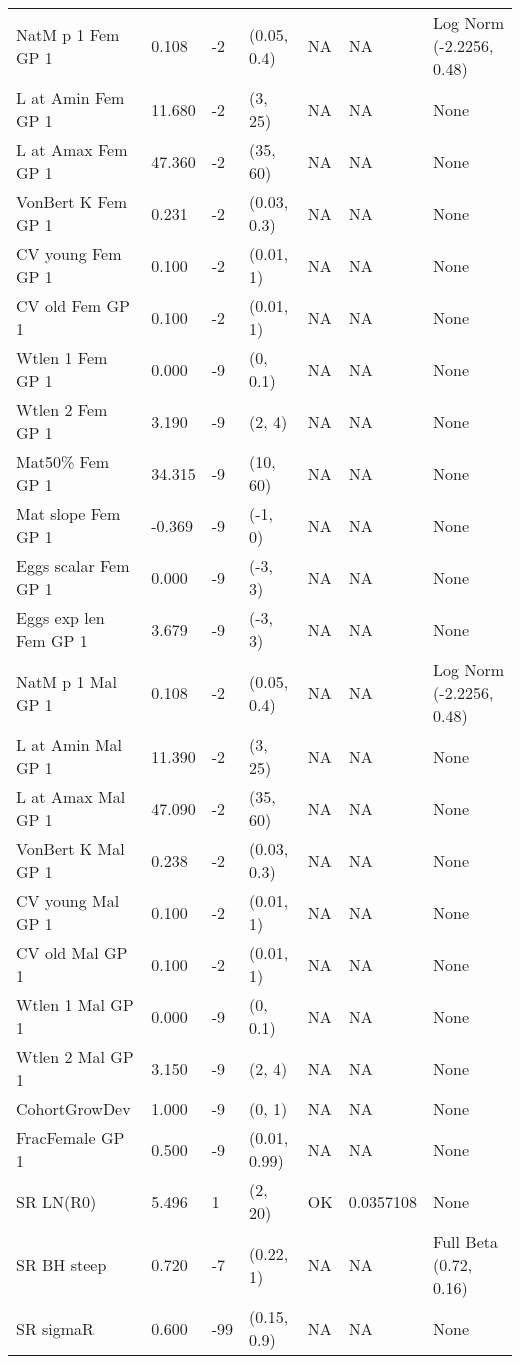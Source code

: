 \documentclass[11pt,
  english,
  a4paper,
]{article}
\begin{document}
\begin{landscape}
\begin{longtable}[t]{>{\raggedright\arraybackslash}p{6cm}lllll>{\raggedright\arraybackslash}p{4cm}}
\endfoot
\bottomrule
\endlastfoot
NatM p 1 Fem GP 1 & 0.108 & -2 & (0.05, 0.4) & NA & NA & Log Norm (-2.2256, 0.48)\\
L at Amin Fem GP 1 & 11.680 & -2 & (3, 25) & NA & NA & None\\
L at Amax Fem GP 1 & 47.360 & -2 & (35, 60) & NA & NA & None\\
VonBert K Fem GP 1 & 0.231 & -2 & (0.03, 0.3) & NA & NA & None\\
CV young Fem GP 1 & 0.100 & -2 & (0.01, 1) & NA & NA & None\\
CV old Fem GP 1 & 0.100 & -2 & (0.01, 1) & NA & NA & None\\
Wtlen 1 Fem GP 1 & 0.000 & -9 & (0, 0.1) & NA & NA & None\\
Wtlen 2 Fem GP 1 & 3.190 & -9 & (2, 4) & NA & NA & None\\
Mat50\% Fem GP 1 & 34.315 & -9 & (10, 60) & NA & NA & None\\
Mat slope Fem GP 1 & -0.369 & -9 & (-1, 0) & NA & NA & None\\
Eggs scalar Fem GP 1 & 0.000 & -9 & (-3, 3) & NA & NA & None\\
Eggs exp len Fem GP 1 & 3.679 & -9 & (-3, 3) & NA & NA & None\\
NatM p 1 Mal GP 1 & 0.108 & -2 & (0.05, 0.4) & NA & NA & Log Norm (-2.2256, 0.48)\\
L at Amin Mal GP 1 & 11.390 & -2 & (3, 25) & NA & NA & None\\
L at Amax Mal GP 1 & 47.090 & -2 & (35, 60) & NA & NA & None\\
VonBert K Mal GP 1 & 0.238 & -2 & (0.03, 0.3) & NA & NA & None\\
CV young Mal GP 1 & 0.100 & -2 & (0.01, 1) & NA & NA & None\\
CV old Mal GP 1 & 0.100 & -2 & (0.01, 1) & NA & NA & None\\
Wtlen 1 Mal GP 1 & 0.000 & -9 & (0, 0.1) & NA & NA & None\\
Wtlen 2 Mal GP 1 & 3.150 & -9 & (2, 4) & NA & NA & None\\
CohortGrowDev & 1.000 & -9 & (0, 1) & NA & NA & None\\
FracFemale GP 1 & 0.500 & -9 & (0.01, 0.99) & NA & NA & None\\
SR LN(R0) & 5.496 & 1 & (2, 20) & OK & 0.0357108 & None\\
SR BH steep & 0.720 & -7 & (0.22, 1) & NA & NA & Full Beta (0.72, 0.16)\\
SR sigmaR & 0.600 & -99 & (0.15, 0.9) & NA & NA & None\\

\end{longtable}
\end{landscape}
\end{document}
